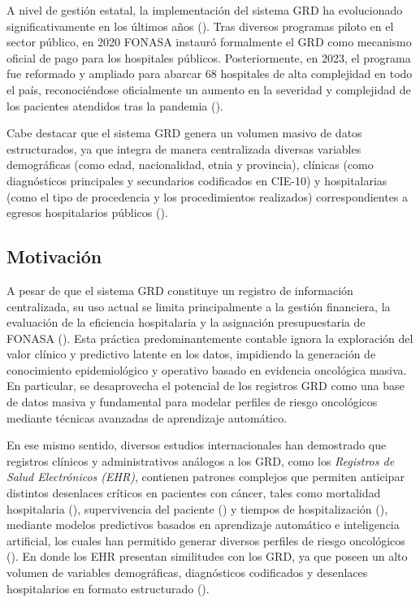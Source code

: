 A nivel de gestión estatal, la implementación del sistema GRD ha evolucionado significativamente en los últimos años (\cite{Cid2024, ClapesUC2023}). Tras diversos programas piloto en el sector público, en 2020 FONASA instauró formalmente el GRD como mecanismo oficial de pago para los hospitales públicos. Posteriormente, en 2023, el programa fue reformado y ampliado para abarcar 68 hospitales de alta complejidad en todo el país, reconociéndose oficialmente un aumento en la severidad y complejidad de los pacientes atendidos tras la pandemia (\cite{Cid2024}).

Cabe destacar que el sistema GRD genera un volumen masivo de datos estructurados, ya que integra de manera centralizada diversas variables demográficas (como edad, nacionalidad, etnia y provincia), clínicas (como diagnósticos principales y secundarios codificados en CIE-10) y hospitalarias (como el tipo de procedencia y los procedimientos realizados) correspondientes a egresos hospitalarios públicos (\cite{Metamodelo2024}).

\subsection{Motivaci\'on}
\label{intro:motivacion}

A pesar de que el sistema GRD constituye un registro de información centralizada, su uso actual se limita principalmente a la gestión financiera, la evaluación de la eficiencia hospitalaria y la asignación presupuestaria de FONASA (\cite{ClapesUC2023, Cid2024}). Esta práctica predominantemente contable ignora la exploración del valor clínico y predictivo latente en los datos, impidiendo la generación de conocimiento epidemiológico y operativo basado en evidencia oncológica masiva. En particular, se desaprovecha el potencial de los registros GRD como una base de datos masiva y fundamental para modelar perfiles de riesgo oncológicos mediante técnicas avanzadas de aprendizaje automático.

En ese mismo sentido, diversos estudios internacionales han demostrado que registros clínicos y administrativos análogos a los GRD, como los \textit{Registros de Salud Electrónicos (EHR)}, contienen patrones complejos que permiten anticipar distintos desenlaces críticos en pacientes con cáncer, tales como mortalidad hospitalaria (\cite{article1}), supervivencia del paciente (\cite{article2}) y tiempos de hospitalización (\cite{article3, article16}), mediante modelos predictivos basados en aprendizaje automático e inteligencia artificial, los cuales han permitido generar diversos perfiles de riesgo oncológicos (\cite{article1}). En donde los EHR presentan similitudes con los GRD, ya que poseen un alto volumen de variables demográficas, diagnósticos codificados y desenlaces hospitalarios en formato estructurado (\cite{article1}).


